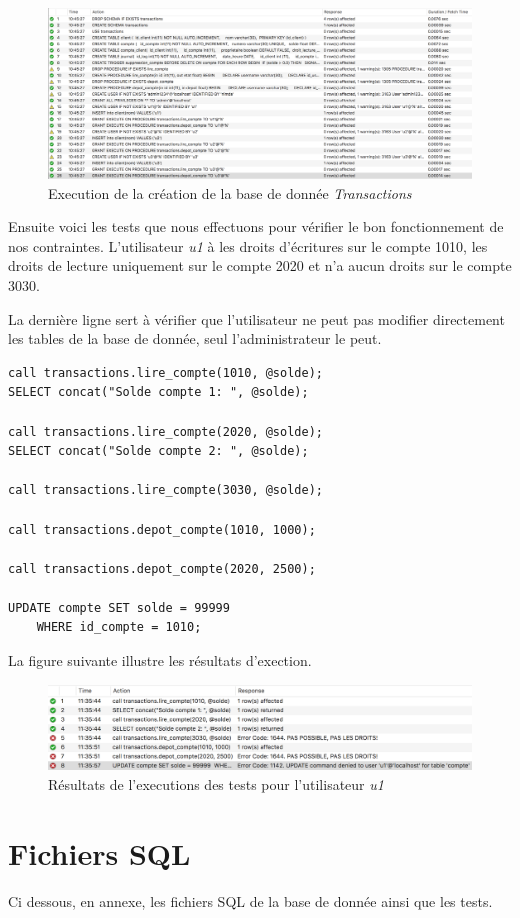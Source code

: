 \documentclass[paper=a4, fontsize=11pt]{scrartcl} %
\numberwithin{equation}{section} %
\numberwithin{figure}{section} %
\numberwithin{table}{section} %
\begin{document}
\begin{figure}[h]
  \centering
  \includegraphics[width=\textwidth]{sqlCreate.png}
  \caption{Execution de la création de la base de donnée \textit{Transactions}}
  \label{fig:sql}
\end{figure}

Ensuite voici les tests que nous effectuons pour vérifier le bon fonctionnement de nos contraintes. L'utilisateur \textit{u1} à les droits d'écritures sur le compte 1010, les droits de lecture uniquement sur le compte 2020 et n'a aucun droits sur le compte 3030. 

La dernière ligne sert à vérifier que l'utilisateur ne peut pas modifier directement les tables de la base de donnée, seul l'administrateur le peut.

\begin{lstlisting}
call transactions.lire_compte(1010, @solde);
SELECT concat("Solde compte 1: ", @solde);

call transactions.lire_compte(2020, @solde);
SELECT concat("Solde compte 2: ", @solde);

call transactions.lire_compte(3030, @solde);

call transactions.depot_compte(1010, 1000);

call transactions.depot_compte(2020, 2500);

UPDATE compte SET solde = 99999
	WHERE id_compte = 1010;
\end{lstlisting}

La figure suivante illustre les résultats d'exection. 

\begin{figure}[h]
  \centering
  \includegraphics[width=\textwidth]{tests.png}
  \caption{Résultats de l'executions des tests pour l'utilisateur \textit{u1}}
  \label{fig:test}
\end{figure}


\newpage
\section{Fichiers SQL}
Ci dessous, en annexe, les fichiers SQL de la base de donnée ainsi que les tests.



\end{document}
